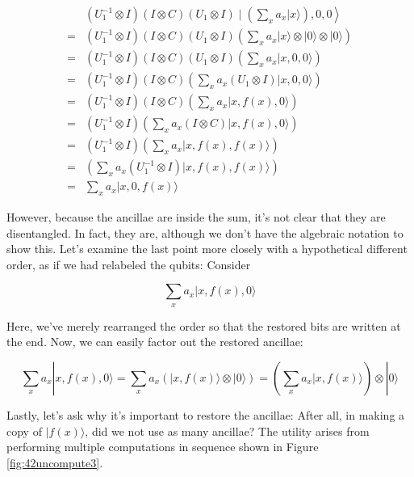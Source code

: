 \documentclass[main.tex]{subfiles}
\begin{document}
    $$
    \begin{aligned}
    &\left.\left(U_{1}^{-1} \otimes I\right)(I \otimes C)\left(U_{1} \otimes I\right) \mid\left(\sum_{x} a_{x}|x\rangle\right), 0,0\right\rangle \\
    =&\left(U_{1}^{-1} \otimes I\right)(I \otimes C)\left(U_{1} \otimes I\right)\left(\sum_{x} a_{x}|x\rangle \otimes|0\rangle \otimes|0\rangle\right) \\
    =&\left(U_{1}^{-1} \otimes I\right)(I \otimes C)\left(U_{1} \otimes I\right)\left(\sum_{x} a_{x}|x, 0,0\rangle\right) \\
    =&\left(U_{1}^{-1} \otimes I\right)(I \otimes C)\left(\sum_{x} a_{x}\left(U_{1} \otimes I\right)|x, 0,0\rangle\right) \\
    =&\left(U_{1}^{-1} \otimes I\right)(I \otimes C)\left(\sum_{x} a_{x}|x, f(x), 0\rangle\right) \\
    =&\left(U_{1}^{-1} \otimes I\right)\left(\sum_{x} a_{x}(I \otimes C)|x, f(x), 0\rangle\right) \\
    =&\left(U_{1}^{-1} \otimes I\right)\left(\sum_{x} a_{x}|x, f(x), f(x)\rangle\right) \\
    =&\left(\sum_{x} a_{x}\left(U_{1}^{-1} \otimes I\right)|x, f(x), f(x)\rangle\right) \\
    =& \sum_{x} a_{x}|x, 0, f(x)\rangle
    \end{aligned}
    $$
    
    However, because the ancillae are inside the sum, it's not clear that they are disentangled. In fact, they are, although we don't have the algebraic notation to show this. Let's examine the last point more closely with a hypothetical different order, as if we had relabeled the qubits: Consider
    
    $$
    \sum_{x} a_{x}|x, f(x), 0\rangle
    $$
    
    Here, we've merely rearranged the order so that the restored bits are written at the end. Now, we can easily factor out the restored ancillae:
    
    $$
    \sum_{x} a_{x}|x, f(x), 0\rangle=\sum_{x} a_{x}(|x, f(x)\rangle \otimes|0\rangle)=\left(\sum_{x} a_{x}|x, f(x)\rangle\right) \otimes|0\rangle
    $$
    
    Lastly, let's ask why it's important to restore the ancillae: After all, in making a copy of $|f(x)\rangle$, did we not use as many ancillae? The utility arises from performing multiple computations in sequence shown in Figure \ref{fig:42uncompute3}.
    
\end{document}
